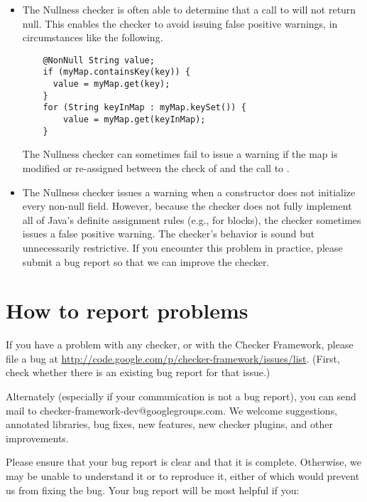 \begin{itemize}
\item
  The Nullness checker is often able to determine that a call to
   will not return null.  This enables the checker to avoid
  issuing false positive warnings, in circumstances like the following.

\begin{Verbatim}
    @NonNull String value;
    if (myMap.containsKey(key)) {
      value = myMap.get(key);
    }
    for (String keyInMap : myMap.keySet()) {
        value = myMap.get(keyInMap);
    }
\end{Verbatim}

  The Nullness checker can sometimes fail to issue a warning if the map is
  modified or re-assigned between the check of  and the
  call to .



\item 
  The Nullness checker issues a warning when a constructor does not
  initialize every non-null field.  However, because the checker does not
  fully implement all of Java's definite assignment rules (e.g., for
   blocks), the checker sometimes issues a false positive
  warning.  The checker's behavior is sound but unnecessarily restrictive.
  If you encounter this problem in practice, please submit a bug report so
  that we can improve the checker.

\end{itemize}



\section{How to report problems\label{reporting-bugs}}

If you have a problem with any checker, or with the Checker Framework,
please file a bug at 
\url{http://code.google.com/p/checker-framework/issues/list}.
(First, check whether there is an existing bug report for that issue.)

Alternately (especially if your communication is not a bug report), you can
send mail to checker-framework-dev@googlegroups.com.
We welcome suggestions, annotated libraries, bug fixes, new
features, new checker plugins, and other improvements.

Please ensure that your bug report is clear and that it is complete.
Otherwise, we may be unable to understand it or to reproduce it, either of
which would prevent us from fixing the bug.  Your bug report will be most
helpful if you:

